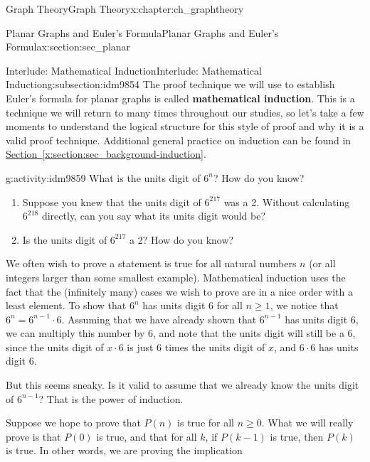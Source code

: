 \documentclass[oneside,10pt,]{book}
\newcommand{\terminology}[1]{\textbf{#1}}
\numberwithin{equation}{chapter}
\begin{document}
\begin{chapterptx}{Graph Theory}{}{Graph Theory}{}{}{x:chapter:ch_graphtheory}
\begin{sectionptx}{Planar Graphs and Euler's Formula}{}{Planar Graphs and Euler's Formula}{}{}{x:section:sec_planar}
%
%
\typeout{************************************************}
\typeout{************************************************}
%
\begin{subsectionptx}{Interlude: Mathematical Induction}{}{Interlude: Mathematical Induction}{}{}{g:subsection:idm9854}
The proof technique we will use to establish Euler's formula for planar graphs is called \terminology{mathematical induction}.  This is a technique we will return to many times throughout our studies, so let's take a few moments to understand the logical structure for this style of proof and why it is a valid proof technique.  Additional general practice on induction can be found in \hyperref[x:section:sec_background-induction]{Section~\ref{x:section:sec_background-induction}}.%
\begin{activity}{}{g:activity:idm9859}%
What is the units digit of \(6^n\)?  How do you know?%
\begin{enumerate}[font=\bfseries,label=(\alph*),ref=\alph*]
\item{}Suppose you knew that the units digit of \(6^{217}\) was a 2.  Without calculating \(6^{218}\) directly, can you say what its units digit would be?%
\item{}Is the units digit of \(6^{217}\) a 2?  How do you know?%
\end{enumerate}
\end{activity}
We often wish to prove a statement is true for all natural numbers \(n\) (or all integers larger than some smallest example).  Mathematical induction uses the fact that the (infinitely many) cases we wish to prove are in a nice order with a least element.  To show that \(6^n\) has units digit 6 for all \(n \ge 1\), we notice that \(6^n = 6^{n-1}\cdot 6\).  Assuming that we have already shown that \(6^{n-1}\) has units digit 6, we can multiply this number by 6, and note that the units digit will still be a 6, since the units digit of \(x \cdot 6\) is just 6 times the units digit of \(x\), and \(6\cdot 6\) has units digit 6.%
\par
But this seems sneaky.  Is it valid to assume that we already know the units digit of \(6^{n-1}\)?  That is the power of induction.%
\par
Suppose we hope to prove that \(P(n)\) is true for all \(n \ge 0\).  What we will really prove is that \(P(0)\) is true, and that for all \(k\), if \(P(k-1)\) is true, then \(P(k)\) is true.  In other words, we are proving the implication%
\begin{equation*}

\end{equation*}
\end{subsectionptx}
\end{sectionptx}
\end{chapterptx}
\end{document}

